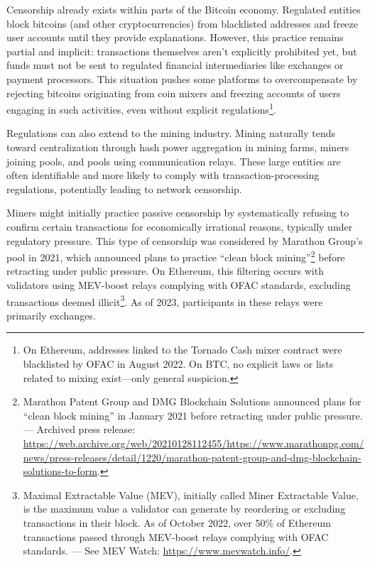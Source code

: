 \documentclass[
  a5paper,
  smalldemyvopaper,10pt,twoside,onecolumn,openright,extrafontsizes,hidelinks]{memoir}
\begin{document}
Censorship already exists within parts of the Bitcoin economy. Regulated
entities block bitcoins (and other cryptocurrencies) from blacklisted
addresses and freeze user accounts until they provide explanations.
However, this practice remains partial and implicit: transactions
themselves aren't explicitly prohibited yet, but funds must not be sent
to regulated financial intermediaries like exchanges or payment
processors. This situation pushes some platforms to overcompensate by
rejecting bitcoins originating from coin mixers and freezing accounts of
users engaging in such activities, even without explicit
regulations\footnote{On Ethereum, addresses linked to the Tornado Cash
  mixer contract were blacklisted by OFAC in August 2022. On BTC, no
  explicit laws or lists related to mixing exist---only general
  suspicion.}.

Regulations can also extend to the mining industry. Mining naturally
tends toward centralization through hash power aggregation in mining
farms, miners joining pools, and pools using communication relays. These
large entities are often identifiable and more likely to comply with
transaction-processing regulations, potentially leading to network
censorship.

Miners might initially practice passive censorship by systematically
refusing to confirm certain transactions for economically irrational
reasons, typically under regulatory pressure. This type of censorship
was considered by Marathon Group's pool in 2021, which announced plans
to practice ``clean block mining''\footnote{Marathon Patent Group and
  DMG Blockchain Solutions announced plans for ``clean block mining'' in
  January 2021 before retracting under public pressure. --- Archived
  press release:
  \url{https://web.archive.org/web/20210128112455/https://www.marathonpg.com/news/press-releases/detail/1220/marathon-patent-group-and-dmg-blockchain-solutions-to-form}.}
before retracting under public pressure. On Ethereum, this filtering
occurs with validators using MEV-boost relays complying with OFAC
standards, excluding transactions deemed illicit\footnote{Maximal
  Extractable Value (MEV), initially called Miner Extractable Value, is
  the maximum value a validator can generate by reordering or excluding
  transactions in their block. As of October 2022, over 50\% of Ethereum
  transactions passed through MEV-boost relays complying with OFAC
  standards. --- See MEV Watch: \url{https://www.mevwatch.info/}.}. As
of 2023, participants in these relays were primarily exchanges.
\end{document}
